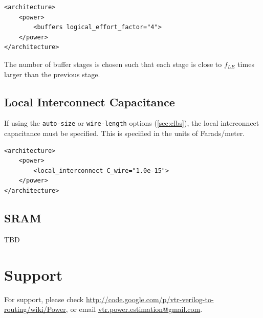 \documentclass[letterpaper,twoside,10pt]{article}
\begin{document}
\begin{BVerbatim}[bgcolor=LightGray, boxwidth=\textwidth] 
<architecture>
	<power>
		<buffers logical_effort_factor="4">
	</power>
</architecture>
\end{BVerbatim}

The number of buffer stages is chosen such that each stage is close to $f_{LE}$ times larger than the previous stage.






\subsection{Local Interconnect Capacitance} \label{sec:local_interc_cap}
If using the \texttt{auto-size} or \texttt{wire-length} options (\autoref{sec:clbs}), the local interconnect capacitance must be specified.  This is specified in the units of Farads/meter.

\begin{BVerbatim}[bgcolor=LightGray, boxwidth=\textwidth] 
<architecture>
	<power>
		<local_interconnect C_wire="1.0e-15">
	</power>
</architecture>
\end{BVerbatim}


\subsection{SRAM}
TBD

\newpage
\section{Support}
For support, please check \url{http://code.google.com/p/vtr-verilog-to-routing/wiki/Power}, or email \href{mailto:vtr.power.estimation@gmail.com}{vtr.power.estimation@gmail.com}.
\end{document}
